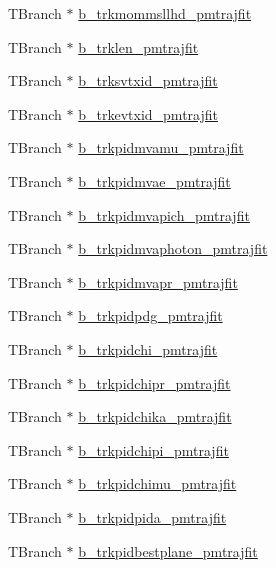 \begin{DoxyCompactItemize}
\item 
T\-Branch $\ast$ \hyperlink{classanatree_ab136c765473d3eeaa83e913d1cf7a844}{b\-\_\-trkmommsllhd\-\_\-pmtrajfit}
\item 
T\-Branch $\ast$ \hyperlink{classanatree_a1184afcee9212f636e62a54a4adb7f3c}{b\-\_\-trklen\-\_\-pmtrajfit}
\item 
T\-Branch $\ast$ \hyperlink{classanatree_aefc586e24cd56120d09725a6de46a4ac}{b\-\_\-trksvtxid\-\_\-pmtrajfit}
\item 
T\-Branch $\ast$ \hyperlink{classanatree_a2213c41f2c43fb483c8209689c99fc8c}{b\-\_\-trkevtxid\-\_\-pmtrajfit}
\item 
T\-Branch $\ast$ \hyperlink{classanatree_af25f24668d25368a9bf068a008a72021}{b\-\_\-trkpidmvamu\-\_\-pmtrajfit}
\item 
T\-Branch $\ast$ \hyperlink{classanatree_a63a9deeb4d5292fc52be7c3cd0e9a315}{b\-\_\-trkpidmvae\-\_\-pmtrajfit}
\item 
T\-Branch $\ast$ \hyperlink{classanatree_a8408bbce06d2e4f22c75ebe5f3370892}{b\-\_\-trkpidmvapich\-\_\-pmtrajfit}
\item 
T\-Branch $\ast$ \hyperlink{classanatree_a3b7f84588633763988e73c91b6fbd9ef}{b\-\_\-trkpidmvaphoton\-\_\-pmtrajfit}
\item 
T\-Branch $\ast$ \hyperlink{classanatree_ac793badcec7bba686785d6f9b2b2c746}{b\-\_\-trkpidmvapr\-\_\-pmtrajfit}
\item 
T\-Branch $\ast$ \hyperlink{classanatree_aa08aff9328f4f4ef62d0e102e49bc7c2}{b\-\_\-trkpidpdg\-\_\-pmtrajfit}
\item 
T\-Branch $\ast$ \hyperlink{classanatree_a51107d835cbb9642a5764d9945f63d9c}{b\-\_\-trkpidchi\-\_\-pmtrajfit}
\item 
T\-Branch $\ast$ \hyperlink{classanatree_ac5a1d422dd967dfe00e3645d422ce49e}{b\-\_\-trkpidchipr\-\_\-pmtrajfit}
\item 
T\-Branch $\ast$ \hyperlink{classanatree_a55878d0d2c89825a394b842aafbd750e}{b\-\_\-trkpidchika\-\_\-pmtrajfit}
\item 
T\-Branch $\ast$ \hyperlink{classanatree_a9ba480fec3a9db28515d7fa626e75053}{b\-\_\-trkpidchipi\-\_\-pmtrajfit}
\item 
T\-Branch $\ast$ \hyperlink{classanatree_a28b3ca9909ebd571ea848e10de9211c1}{b\-\_\-trkpidchimu\-\_\-pmtrajfit}
\item 
T\-Branch $\ast$ \hyperlink{classanatree_acdf6bfe08dc310159742a57820b1f3c8}{b\-\_\-trkpidpida\-\_\-pmtrajfit}
\item 
T\-Branch $\ast$ \hyperlink{classanatree_af6458101534e3a5d775a7bb56ea3d6b3}{b\-\_\-trkpidbestplane\-\_\-pmtrajfit}

\end{DoxyCompactItemize}
